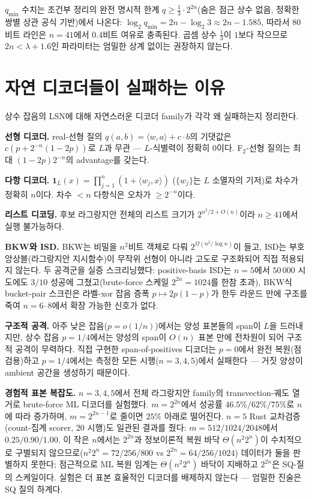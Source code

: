 \documentclass[11pt,a4paper]{article}
\theoremstyle{plain}
\theoremstyle{definition}
\begin{document}
$q_{\min}$ 수치는 조건부 정리의 완전 명시적 한계 $q \ge \tfrac13 \cdot 2^{2n}$(숨은 점근 상수 없음, 정확한 쌍별 상관 공식 기반)에서 나온다: $\log_2 q_{\min} = 2n - \log_2 3 \approx 2n - 1.585$, 따라서 80비트 라인은 $n=41$에서 $0.4$비트 여유로 충족된다. 곱셈 상수 $\tfrac13$이 $1$보다 작으므로 $2n < \lambda + 1.6$인 파라미터는 엄밀한 상계 없이는 권장하지 않는다.

\section{자연 디코더들이 실패하는 이유}

상수 잡음의 LSN에 대해 자연스러운 디코더 family가 각각 왜 실패하는지 정리한다.

\textbf{선형 디코더.} real-선형 질의 $q(a,b) = \langle w,a\rangle + c\cdot b$의 기댓값은 $c(p + 2^{-n}(1-2p))$로 $L$과 무관 --- $L$-식별력이 정확히 0이다. F$_2$-선형 질의는 최대 $(1-2p)2^{-n}$의 advantage를 갖는다.

\textbf{다항 디코더.} $\mathbf{1}_L(x) = \prod_{j=1}^n (1 + \langle w_j, x\rangle)$ ($\{w_j\}$는 $L$ 소멸자의 기저)로 차수가 정확히 $n$이다. 차수 $<n$ 다항식은 오차가 $\ge 2^{-n}$이다.

\textbf{리스트 디코딩.} 후보 라그랑지안 전체의 리스트 크기가 $2^{n^2/2+O(n)}$이라 $n \ge 41$에서 실행 불가능하다.

\textbf{BKW와 ISD.} BKW는 비밀을 $n^2$비트 객체로 다뤄 $2^{\Omega(n^2/\log n)}$이 들고, ISD는 부호 앙상블(라그랑지안 지시함수)이 무작위 선형이 아니라 고도로 구조화되어 직접 적용되지 않는다. 두 공격군을 실증 스크리닝했다: positive-basis ISD는 $n=5$에서 $50\,000$ 시도에도 $3/10$ 성공에 그쳤고(brute-force 스케일 $2^{2n}=1024$를 한참 초과), BKW식 bucket-pair 스크린은 라벨-xor 잡음 증폭 $p\mapsto2p(1-p)$가 한두 라운드 만에 구조를 죽여 $n=6$--$8$에서 확장 가능한 신호가 없다.

\textbf{구조적 공격.} 아주 낮은 잡음($p = o(1/n)$)에서는 양성 표본들의 span이 $L$을 드러내지만, 상수 잡음 $p=1/4$에서는 양성의 span이 $O(n)$ 표본 만에 전차원이 되어 구조적 공격이 무력하다. 직접 구현한 span-of-positives 디코더는 $p=0$에서 완전 복원(점검용)하고 $p=1/4$에서는 측정한 모든 시행($n=3,4,5$)에서 실패한다 --- 거짓 양성이 ambient 공간을 생성하기 때문이다.

\textbf{경험적 표본 복잡도.} $n=3,4,5$에서 전체 라그랑지안 family의 transvection-궤도 열거로 brute-force ML 디코더를 실험했다. $m = 2^{2n}$에서 성공률 $46.5\%/62\%/75\%$로 $n$에 따라 증가하며, $m = 2^{2n-1}$로 줄이면 $25\%$ 아래로 떨어진다. $n=5$ Rust 교차검증(count-집계 scorer, 20 시행)도 일관된 결과를 줬다: $m=512/1024/2048$에서 $0.25/0.90/1.00$. 이 작은 $n$에서는 $2^{2n}$과 정보이론적 복원 바닥 $\Theta(n^2 2^n)$이 수치적으로 구별되지 않으므로($n^2 2^n = 72/256/800$ vs $2^{2n} = 64/256/1024$) 데이터가 둘을 판별하지 못한다; 점근적으로 ML 복원 임계는 $\Theta(n^2 2^n)$ 바닥이 지배하고 $2^{2n}$은 SQ-질의 스케일이다. 실험은 더 표본 효율적인 디코더를 배제하지 않는다 --- 엄밀한 진술은 SQ 질의 하계다.
\end{document}
